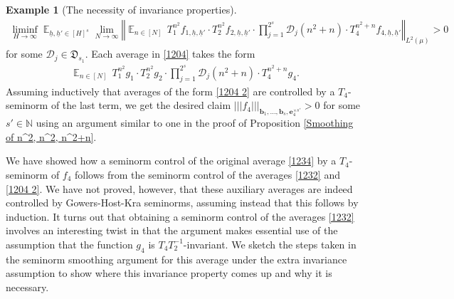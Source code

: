 \documentclass[11pt]{amsart}
\theoremstyle{definition}
\newtheorem{example}{Example}
\newcommand{\N}{{\mathbb N}}
\newcommand{\CD}{{\mathcal D}}
\newcommand{\FD}{{\mathfrak D}}
\newcommand{\be}{{\mathbf{e}}}
\renewcommand{\b}{{\textbf{b}}}
\newcommand{\uh}{{\underline{h}}}
\newcommand{\norm}[1]{\left\Vert #1\right\Vert}
\newcommand{\nnorm}[1]{\lvert\!|\!| #1|\!|\!\rvert}
\newcommand{\inv}{^{-1}}
\DeclareMathOperator*{\E}{\mathbb{E}}
\begin{document}
\begin{example}[The necessity of invariance properties]
\begin{align}\label{1204}
    \liminf_{H\to\infty}\E_{\uh,\uh'\in [H]^{s}}\lim_{N\to\infty}\norm{ \E_{n\in[N]} \, T_1^{n^2} f_{1, \uh, \uh'}\cdot T_2^{n^2} f_{2, \uh, \uh'} \cdot \prod_{j=1}^{2^{s}}\CD_{j}(n^2+n)\cdot T_4^{n^2+n}f_{4, \uh, \uh'}}_{L^2(\mu)}>0
\end{align}
for some $\CD_j\in \FD_{s_1}$.  Each average in \eqref{1204} takes the form
\begin{align}\label{1204 2}
    \E_{n\in[N]} \, T_1^{n^2} g_1\cdot T_2^{n^2} g_2 \cdot \prod_{j=1}^{2^{s}}\CD_{j}(n^2+n)\cdot T_4^{n^2+n} g_4.
\end{align}
Assuming inductively that averages of the form \eqref{1204 2} are controlled by a $T_4$-seminorm of the last term, we get the desired claim $\nnorm{f_4}_{\b_1, \ldots, \b_s, \be_4^{\times s'}}>0$ for some $s'\in\N$ using an argument similar to one in the proof of Proposition \ref{Smoothing of n^2, n^2, n^2+n}.

We have showed how a seminorm control of the original average \eqref{1234} by a $T_4$-seminorm of $f_4$ follows from the seminorm control of the averages \eqref{1232} and \eqref{1204 2}. We have not proved, however, that these auxiliary averages are indeed controlled by Gowers-Host-Kra seminorms, assuming instead that this follows by induction. It turns out that obtaining a seminorm control of the averages \eqref{1232} involves an interesting twist in that the argument makes essential use of the assumption that the function $g_4$ is $T_4 T_2\inv$-invariant. We sketch the steps taken in the seminorm smoothing argument for this average under the extra invariance assumption to show where this invariance property comes up and why it is necessary.


\end{example}
\end{document}
